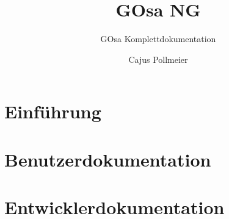 \documentclass[draft=true,fontsize=12,paper=A4,parskip=half-]{scrbook}
\begin{document}
  \title{GOsa NG}
  \author{Cajus Pollmeier}
  \subtitle{GOsa Komplettdokumentation}
  \publishers{Veröffentlicht vom GOsa-Team}
  \maketitle

  \tableofcontents

  \part{Einführung}

  \ifpdfoutput{\ihead[\putchapterthumb]{\putchapterthumb}}{}
  
  \ifpdfoutput{\ihead[]{}}{}

  \part{Benutzerdokumentation}
  \ifpdfoutput{\ihead[\putchapterthumb]{\putchapterthumb}}{}
  \ifpdfoutput{\ihead[]{}}{}

  \part{Entwicklerdokumentation}
  \ifpdfoutput{\ihead[\putchapterthumb]{\putchapterthumb}}{}
  
  
  
  
  \ifpdfoutput{\ihead[]{}}{}
\end{document}
